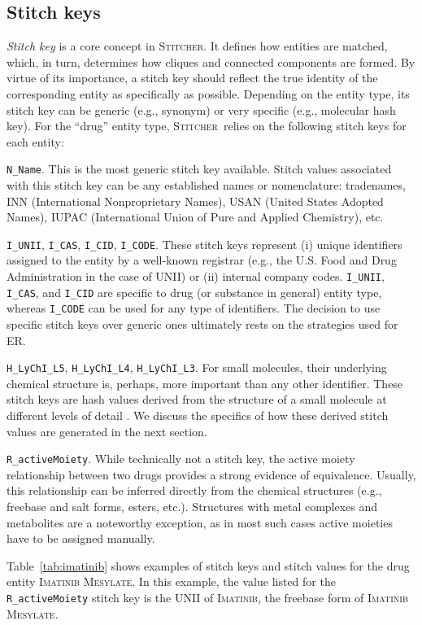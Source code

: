 \documentclass{bmcart}
\newcommand\st{\textsc{Stitcher}}
\begin{document}
\subsection*{Stitch keys}\label{sec:stitch-keys}
\emph{Stitch key} is a core concept in \st. It defines how entities are
matched, which, in turn, determines how cliques and connected
components are formed. By virtue of its importance, a stitch key
should reflect the true identity of the corresponding entity as specifically as possible.
Depending on the entity type, its stitch key can be generic (e.g., 
synonym) or very specific (e.g., molecular hash key). For the ``drug'' entity
type, \st\ relies on the following stitch keys for each entity: 
\begin{description}
\item{\texttt{N\_Name}.} This is the most generic stitch key
available. Stitch values associated with this stitch key can be any
established names or nomenclature: tradenames, INN
(International Nonproprietary Names), USAN (United States Adopted
Names), IUPAC (International Union of Pure and Applied Chemistry), etc. 
\item{\texttt{I\_UNII}, \texttt{I\_CAS}, \texttt{I\_CID}, \texttt{I\_CODE}.}
These stitch keys represent (i) unique identifiers assigned to the entity by
a well-known registrar (e.g., the U.S. Food and Drug Administration in
the case of UNII) or (ii) internal company codes. \texttt{I\_UNII},
\texttt{I\_CAS}, and \texttt{I\_CID} are specific to drug (or
substance in general) entity type, whereas \texttt{I\_CODE} can be
used for any type of identifiers. The decision to use specific stitch
keys over generic ones ultimately rests on the strategies used for ER.
\item{\texttt{H\_LyChI\_L5}, \texttt{H\_LyChI\_L4}, \texttt{H\_LyChI\_L3}.}
For small molecules, their underlying chemical structure is, 
perhaps, more important than any other identifier. These
stitch keys are hash values derived from the structure of a small molecule at
different levels of detail \cite{lychi}. We discuss the specifics of how these
derived stitch values are generated in the next section.
\item{\texttt{R\_activeMoiety}.} While technically not a stitch key, the
active moiety relationship between two drugs provides a strong
evidence of equivalence. Usually, this relationship can be inferred
directly from the chemical structures (e.g., freebase and salt forms,
esters, etc.). Structures with metal complexes and metabolites are a noteworthy exception, 
as in most such cases active moieties have to be assigned manually.
\end{description}
Table~\ref{tab:imatinib} shows examples of stitch keys and stitch values for
the drug entity \textsc{Imatinib Mesylate}. In this example,
the value listed for the \texttt{R\_activeMoiety} stitch key is the UNII of 
\textsc{Imatinib}, the freebase form of \textsc{Imatinib Mesylate}.
\end{document}
